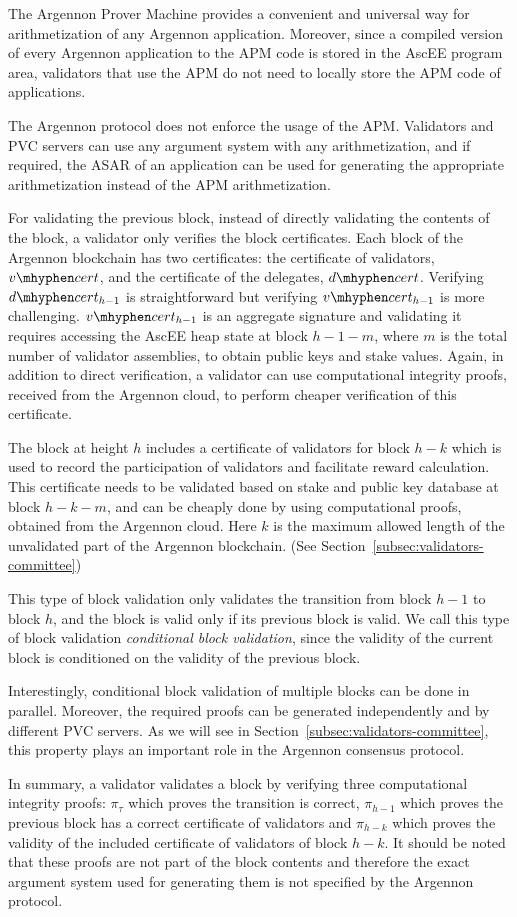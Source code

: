 The Argennon Prover Machine provides a convenient and universal way for arithmetization of any Argennon
application. Moreover, since a compiled version of every Argennon application to the APM code is stored in the AscEE
program area, validators that use the APM do not need to locally store the APM code of applications.

The Argennon protocol does not enforce the usage of the APM. Validators and PVC servers can use any argument system
with any arithmetization, and if required, the ASAR of an application can be used
for generating the appropriate arithmetization instead of the APM arithmetization.

For validating the previous block, instead of directly validating the contents of the block, a validator only
verifies the block certificates. Each block of the Argennon blockchain has two certificates: the certificate of
validators, $v \mhyphen cert$, and the certificate of the delegates, $d \mhyphen cert$. Verifying $d \mhyphen
cert_{h-1}$ is straightforward but verifying $v \mhyphen cert_{h-1}$ is more challenging. $v \mhyphen cert_{h-1}$ is an
aggregate signature and validating it requires accessing the AscEE heap state at block $h-1-m$, where $m$ is the
total number of validator assemblies, to obtain public keys and stake values. Again, in addition to direct
verification, a validator can use computational integrity proofs, received from the Argennon cloud, to perform
cheaper verification of this certificate.

The block at height $h$ includes a certificate of validators for block $h-k$ which is used to record the participation
of validators and facilitate reward calculation. This certificate needs to be validated based on stake and public key
database at block $h-k-m$, and can be cheaply done by using computational proofs, obtained from the Argennon cloud.
Here $k$ is the maximum allowed length of the unvalidated part of the Argennon blockchain. (See
Section~\ref{subsec:validators-committee})

This type of block validation only validates the transition from block $h-1$ to block $h$, and the block is valid
only if its previous block is valid. We
call this type of block validation \emph{conditional block validation}, since the validity of the current block is
conditioned on the validity of the previous block.

Interestingly, conditional block validation of multiple blocks can be done in parallel. Moreover, the required proofs
can be generated independently and by different PVC servers. As we will see in
Section~\ref{subsec:validators-committee}, this property plays an important role in the Argennon consensus protocol.

In summary, a validator validates a block by verifying three computational integrity proofs: $\pi_{\tau}$ which proves
the transition is correct, $\pi_{h-1}$ which proves the previous block has a correct certificate of validators and
$\pi_{h-k}$ which proves the validity of the included certificate of validators of block $h-k$. It should be noted that
these proofs are not part of the block contents and therefore the exact argument system used for generating them is
not specified by the Argennon protocol.